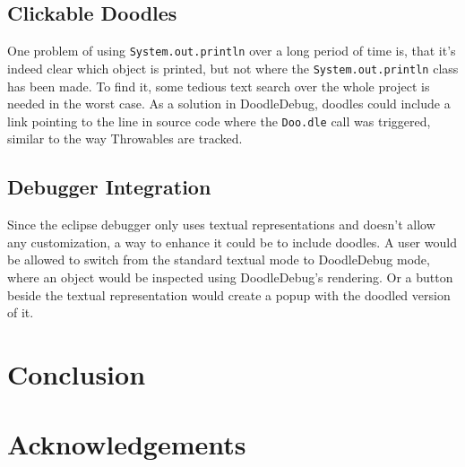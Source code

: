 \documentclass[english]{scrartcl}
\newcommand{\DD}{Dood\-le\-De\-bug\xspace}
\newcommand{\Doodle}{\texttt{Doo.\-dle}\xspace}
\newcommand{\println}{\texttt{Sys\-tem.\-out.\-println}\xspace}
\begin{document}
\subsection{Clickable Doodles}
One problem of using \println over a long period of time is, that it's indeed clear which object is printed, but not where the \println class has been made.
To find it, some tedious text search over the whole project is needed in the worst case.
As a solution in \DD, doodles could include a link pointing to the line in source code where the \Doodle call was triggered, similar to the way Throwables are tracked.

\subsection{Debugger Integration}
Since the eclipse debugger only uses textual representations and doesn't allow any customization, a way to enhance it could be to include doodles.
A user would be allowed to switch from the standard textual mode to \DD mode, where an object would be inspected using \DD's rendering.
Or a button beside the textual representation would create a popup with the doodled version of it.

\section{Conclusion}


\section{Acknowledgements}
\end{document}
